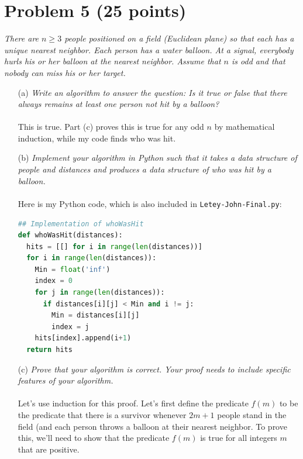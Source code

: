 \documentclass[12pt]{article}
\begin{document}
{\section*{{\selectfont Problem 5 (25 points)}}\vspace{-10mm}
\textsl{There are $n \geq 3$ people positioned on a field (Euclidean plane) so that each has a unique nearest neighbor. Each person has a water balloon. At a signal, everybody hurls his or her balloon at the nearest neighbor. Assume that $n$ is odd and that nobody can miss his or her target.}
\begin{enumerate}
\item[(a)]\textsl{Write an algorithm to answer the question: Is it true or false that there always remains at least one person not hit by a balloon?}\\ \\
This is true. Part (c) proves this is true for any odd $n$ by mathematical induction, while my code finds who was hit. 
\item[(b)]\textsl{Implement your algorithm in Python such that it takes a data structure of people and distances and produces a data structure of who was hit by a balloon.}\\ \\
Here is my Python code, which is also included in \texttt{Letey-John-Final.py}:
\begin{lstlisting}[language=Python]
## Implementation of whoWasHit
def whoWasHit(distances):
  hits = [[] for i in range(len(distances))]
  for i in range(len(distances)):
    Min = float('inf')
    index = 0
    for j in range(len(distances)):
      if distances[i][j] < Min and i != j:
        Min = distances[i][j]
        index = j
    hits[index].append(i+1)
  return hits
\end{lstlisting}
\item[(c)]\textsl{Prove that your algorithm is correct. Your proof needs to include specific features of your algorithm.}\\ \\
Let's use induction for this proof. Let's first define the predicate $f(m)$ to be the predicate that there is a survivor whenever $2m + 1$ people stand in the field (and each person throws a balloon at their nearest neighbor. To prove this, we'll need to show that the predicate $f(m)$ is true for all integers $m$ that are positive. \\ \\

\end{enumerate}}
\end{document}
